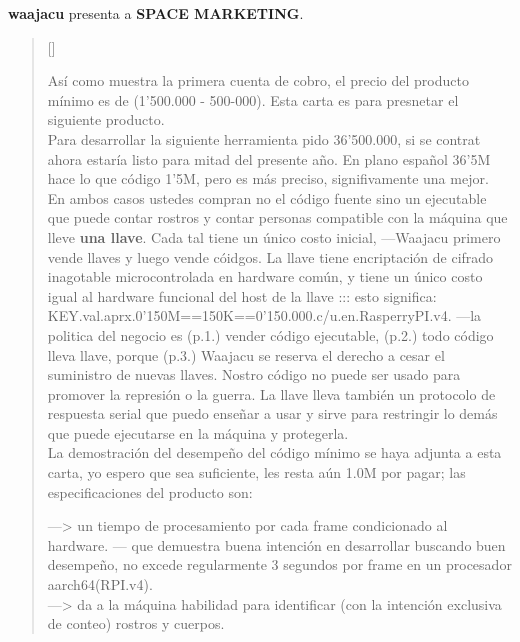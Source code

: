 \documentclass[11pt, a4paper]{article} %
\begin{document}
\textbf{waajacu} presenta a \textbf{SPACE MARKETING}.\\
\poemtitle{}

\settowidth{\versewidth}{DULCE DICHA OCULTA DE LOS QUE SE REBELAN SÓLOS } %

\begin{verse}[\versewidth]
{\scriptsize
 
Así como muestra la primera cuenta de cobro, 
el precio del producto mínimo es de 
(1'500.000 - 500-000). Esta carta es para presnetar el siguiente producto.\\

Para desarrollar la siguiente herramienta pido 36'500.000, si se contrat ahora 
estaría listo para mitad del presente año. 
En plano español 36'5M hace lo que código 1'5M, pero es más preciso, signifivamente 
una mejor. \\

En ambos casos ustedes compran no el 
código fuente sino un ejecutable que puede contar rostros y contar personas 
compatible con la máquina que lleve \textbf{una llave}. 
Cada tal tiene un único costo inicial, ---Waajacu primero vende llaves 
y luego vende cóidgos. La llave tiene encriptación 
de cifrado inagotable microcontrolada en hardware común, 
y tiene un único costo igual al hardware funcional del host 
de la llave ::: 
esto significa: KEY.val.aprx.0'150M==150K==0'150.000.c/u.en.RasperryPI.v4. 
---la politica del negocio es (p.1.) vender código ejecutable, 
(p.2.) todo código lleva llave, porque (p.3.) Waajacu se reserva el derecho 
a cesar el suministro de nuevas llaves. Nostro código no puede ser usado 
para promover la represión o la guerra. La llave lleva también un 
protocolo de respuesta serial que puedo enseñar a usar 
y sirve para restringir lo demás que puede ejecutarse en la máquina y protegerla. \\

La demostración del desempeño del código mínimo se haya adjunta a esta carta, 
yo espero que sea suficiente, les resta aún 1.0M por pagar; las especificaciones 
del producto son:

---> un tiempo de procesamiento por cada frame condicionado al hardware. ---
que demuestra buena intención en desarrollar buscando buen desempeño, 
no excede regularmente 3 segundos por frame en un procesador aarch64(RPI.v4). \\

---> da a la máquina habilidad para identificar (con la intención exclusiva de conteo) 
rostros y cuerpos. \\

}
\end{verse}
\end{document}
